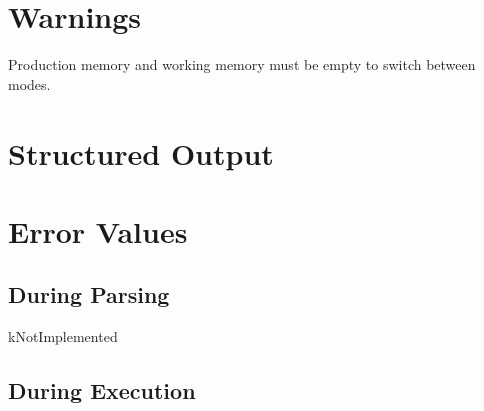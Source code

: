 \documentclass[10pt]{article}
\begin{document}
\section*{ Warnings }


 Production memory and working memory must be empty to switch between modes. 
\section*{ Structured Output }
\section*{ Error Values }
\subsection*{ During Parsing }


 kNotImplemented
\subsection*{ During Execution }
\end{document}

